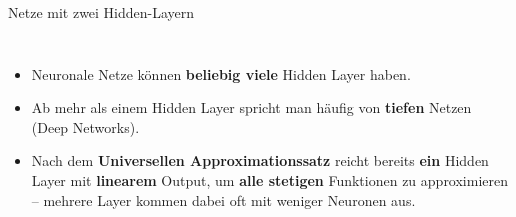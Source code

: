 \begin{frame}{Netze mit zwei Hidden-Layern}
\footnotesize
\begin{columns}
\begin{itemize}
  \item Neuronale Netze können \textbf{beliebig viele} Hidden Layer haben.
  \item Ab mehr als einem Hidden Layer spricht man häufig von \textbf{tiefen}
        Netzen (Deep Networks).
  \item Nach dem \textbf{Universellen Approximationssatz} reicht bereits
        \textbf{ein} Hidden Layer mit \textbf{linearem} Output, um
        \textbf{alle stetigen} Funktionen zu approximieren -- mehrere
        Layer kommen dabei oft mit weniger Neuronen aus.
\end{itemize}

\centering


\end{columns}
\end{frame}
